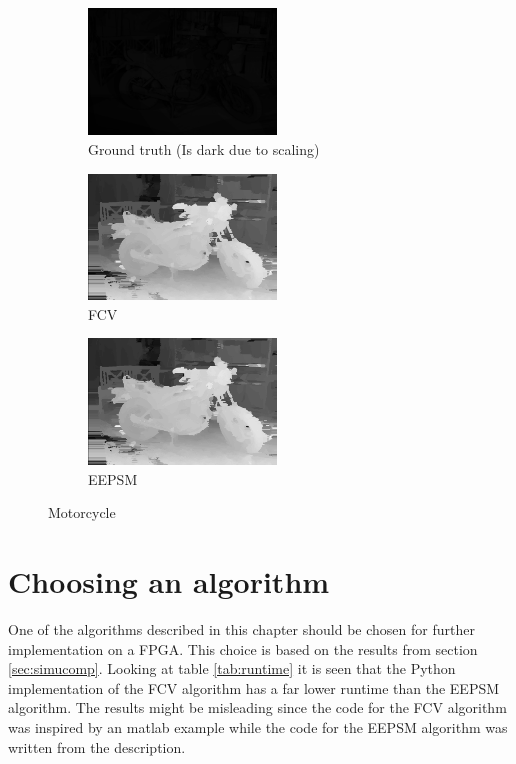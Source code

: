 \begin{figure}[ht]
  \centering
  \begin{subfigure}[t]{0.3\textwidth}
    \centering\includegraphics[width=5cm]{figures/mot_GT}
    \caption{Ground truth \cite{Scharstein2014} (Is dark due to scaling) \label{fig:mot_gt}}
  \end{subfigure}\hspace{0.5cm}
  \begin{subfigure}[t]{0.3\textwidth}
    \centering\includegraphics[width=5cm]{figures/mot_fcv}
    \caption{FCV\label{fig:mot_fcv}}
  \end{subfigure}\hspace{0.5cm}
  \begin{subfigure}[t]{0.3\textwidth}
    \centering\includegraphics[width=5cm]{figures/mot_fcv}
    \caption{EEPSM\label{fig:mot_eepsm}}
  \end{subfigure}
  \caption{Motorcycle\label{fig:motall}}
\end{figure}

\section{Choosing an algorithm}
One of the algorithms described in this chapter should be chosen for further implementation on a FPGA. This choice is based on the results from section \vref{sec:simucomp}. Looking at table \ref{tab:runtime} it is seen that the Python implementation of the FCV algorithm has a far lower runtime than the EEPSM algorithm. The results might be misleading since the code for the FCV algorithm was inspired by an matlab example while the code for the EEPSM algorithm was written from the description.\\

